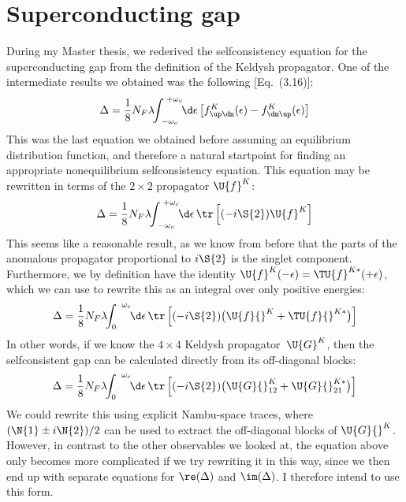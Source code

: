 \section{Superconducting gap}
During my Master thesis, we rederived the selfconsistency equation for the superconducting gap from the definition of the Keldysh propagator.
One of the intermediate results we obtained was the following [Eq.~(3.16)]:
\begin{equation}
  \Delta = \frac{1}{8} N_F \lambda \!\!\int_{\;-\omega_c}^{\;+\omega_c} \!\!\d\epsilon\, \big[ f^K_{\up\dn}(\epsilon) - f^K_{\dn\up}(\epsilon) \big]
\end{equation}
This was the last equation we obtained before assuming an equilibrium distribution function, and therefore a natural startpoint for finding an appropriate nonequilibrium selfconsistency equation.
This equation may be rewritten in terms of the $2\times2$ propagator $\U{f}^K$:
\begin{equation}
  \Delta = \frac{1}{8} N_F \lambda \!\!\int_{\;-\omega_c}^{\;+\omega_c} \!\!\d\epsilon\, \tr\left[ (-i\S{2})\U{f}^K \right]
\end{equation}
This seems like a reasonable result, as we know from before that the parts of the anomalous propagator proportional to $i\S{2}$ is the singlet component.
Furthermore, we by definition have the identity $\U{f}^K(-\epsilon) = \TU{f}^{K*}(+\epsilon)$, which we can use to rewrite this as an integral over only positive energies:
\begin{equation}
  \Delta = \frac{1}{8} N_F \lambda \!\!\int_{0}^{\;\;\omega_c} \!\!\d\epsilon\, \tr\left[ (-i\S{2})\big(\U{f}{}^K + \TU{f}{}^{K*}\big)\right]
\end{equation}
In other words, if we know the $4\times4$ Keldysh propagator~$\U{G}^K$, then the selfconsistent gap can be calculated directly from its off-diagonal blocks:
\begin{equation}
  \Delta = \frac{1}{8} N_F \lambda \!\!\int_{0}^{\;\;\omega_c} \!\!\d\epsilon\, \tr\left[ (-i\S{2})\big(\U{G}{}^K_{12} + \U{G}{}^{K*}_{21}\big)\right]
\end{equation}
We could rewrite this using explicit Nambu-space traces, where $(\N{1} \pm i\N{2})/2$ can be used to extract the off-diagonal blocks of $\U{G}{}^K$.
However, in contrast to the other observables we looked at, the equation above only becomes more complicated if we try rewriting it in this way, since we then end up with separate equations for $\re(\Delta)$ and $\im(\Delta)$.
I therefore intend to use this form.


